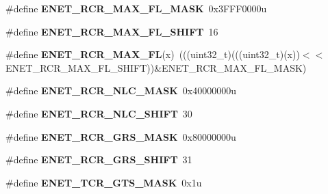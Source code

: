 \begin{DoxyCompactItemize}
\item 
\#define {\bfseries E\+N\+E\+T\+\_\+\+R\+C\+R\+\_\+\+M\+A\+X\+\_\+\+F\+L\+\_\+\+M\+A\+SK}~0x3\+F\+F\+F0000u\hypertarget{group__ENET__Register__Masks_ga1e61cf8300255cf3f9873a6bd9e1ffe6}{}\label{group__ENET__Register__Masks_ga1e61cf8300255cf3f9873a6bd9e1ffe6}

\item 
\#define {\bfseries E\+N\+E\+T\+\_\+\+R\+C\+R\+\_\+\+M\+A\+X\+\_\+\+F\+L\+\_\+\+S\+H\+I\+FT}~16\hypertarget{group__ENET__Register__Masks_ga835b5d285dad4b324f26c4edcc4e00d1}{}\label{group__ENET__Register__Masks_ga835b5d285dad4b324f26c4edcc4e00d1}

\item 
\#define {\bfseries E\+N\+E\+T\+\_\+\+R\+C\+R\+\_\+\+M\+A\+X\+\_\+\+FL}(x)~(((uint32\+\_\+t)(((uint32\+\_\+t)(x))$<$$<$E\+N\+E\+T\+\_\+\+R\+C\+R\+\_\+\+M\+A\+X\+\_\+\+F\+L\+\_\+\+S\+H\+I\+FT))\&E\+N\+E\+T\+\_\+\+R\+C\+R\+\_\+\+M\+A\+X\+\_\+\+F\+L\+\_\+\+M\+A\+SK)\hypertarget{group__ENET__Register__Masks_gaec423542908c9af09d60a00a42243f02}{}\label{group__ENET__Register__Masks_gaec423542908c9af09d60a00a42243f02}

\item 
\#define {\bfseries E\+N\+E\+T\+\_\+\+R\+C\+R\+\_\+\+N\+L\+C\+\_\+\+M\+A\+SK}~0x40000000u\hypertarget{group__ENET__Register__Masks_ga2674365ca4dece5419e50ec62cfdd87c}{}\label{group__ENET__Register__Masks_ga2674365ca4dece5419e50ec62cfdd87c}

\item 
\#define {\bfseries E\+N\+E\+T\+\_\+\+R\+C\+R\+\_\+\+N\+L\+C\+\_\+\+S\+H\+I\+FT}~30\hypertarget{group__ENET__Register__Masks_gabd7c089e6785c4900d6fc5491db4f5ce}{}\label{group__ENET__Register__Masks_gabd7c089e6785c4900d6fc5491db4f5ce}

\item 
\#define {\bfseries E\+N\+E\+T\+\_\+\+R\+C\+R\+\_\+\+G\+R\+S\+\_\+\+M\+A\+SK}~0x80000000u\hypertarget{group__ENET__Register__Masks_ga01f144e600f9007df4d9cdc9d7f3879a}{}\label{group__ENET__Register__Masks_ga01f144e600f9007df4d9cdc9d7f3879a}

\item 
\#define {\bfseries E\+N\+E\+T\+\_\+\+R\+C\+R\+\_\+\+G\+R\+S\+\_\+\+S\+H\+I\+FT}~31\hypertarget{group__ENET__Register__Masks_ga6e192fa69584cca04e717c077d1bf702}{}\label{group__ENET__Register__Masks_ga6e192fa69584cca04e717c077d1bf702}

\item 
\#define {\bfseries E\+N\+E\+T\+\_\+\+T\+C\+R\+\_\+\+G\+T\+S\+\_\+\+M\+A\+SK}~0x1u\hypertarget{group__ENET__Register__Masks_ga99d109b14e8bda3be968900968045b8d}{}\label{group__ENET__Register__Masks_ga99d109b14e8bda3be968900968045b8d}


\end{DoxyCompactItemize}
